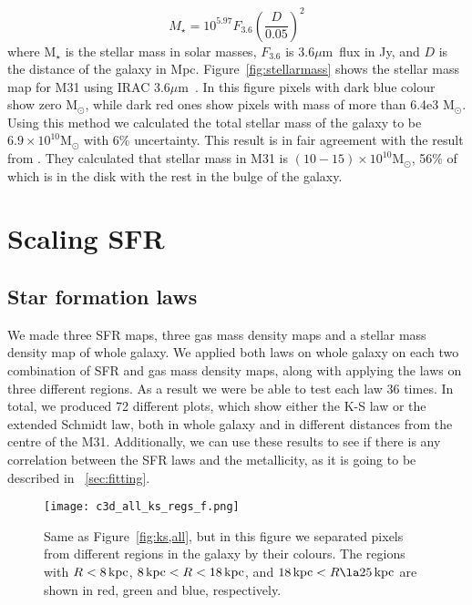 \documentclass[useAMS,usenatbib]{mn2e}
\newcommand \kpc        {\,{\rm kpc}}
\newcommand \um    {$\mu$m\ }
\begin{document}
\begin{equation}
\label{equ:eskew}
M _{\star}= 10^{5.97} F_{3.6}\left(\frac{D}{0.05}\right)^2
\end{equation}
where M$_{\star}$ is the stellar mass in solar masses, $F_{3.6}$ is 3.6\um flux in Jy, and $D$ is the distance of the galaxy in Mpc. Figure~\ref{fig:stellarmass} shows the stellar mass map for M31 using IRAC 3.6\um. In this figure pixels with dark blue colour show zero M$_{\odot}$, while dark red ones show pixels with mass of more than 6.4e3 M$_{\odot}$. Using this method we calculated the total stellar mass of the galaxy to be $6.9 \times 10^{10}$M$_{\odot}$ with 6$\%$ uncertainty. This result is in fair agreement with the result from \cite{Tamm12}. They calculated that stellar mass in M31 is $(10-15) \times 10^{10}$M$_{\odot}$, 56$\%$ of which is in the disk with the rest in the bulge of the galaxy.


\section{Scaling SFR}
\subsection{Star formation laws}

We made three SFR maps, three gas mass density maps and a stellar mass density map of whole galaxy. We applied both laws on whole galaxy on each two combination of SFR and gas mass density maps, along with applying the laws on three different regions. As a result we were be able to test each law 36 times. In total, we produced 72 different plots, which show either the K-S law or the extended Schmidt law, both in whole galaxy and in different distances from the centre of the M31. Additionally, we can use these results to see if there is any correlation between the SFR laws and the metallicity, as it is going to be described in ~\ref{sec:fitting}.
  
\begin{figure*}
\texttt{[image: c3d\_all\_ks\_regs\_f.png]}
\caption{Same as Figure~\ref{fig:ks,all}, but in this figure we separated pixels from different regions in the galaxy by their colours. The regions with $R< 8\kpc$, $8\kpc < R < 18\kpc$, and $18\kpc < R \la 25\kpc$ are shown in red, green and blue, respectively.}
\label{fig:ks,regs}
\end{figure*}
\end{document}
